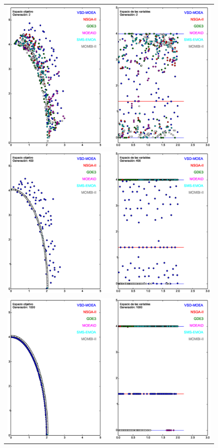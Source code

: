 \begin{figure}[t]
\centering
\begin{tabular}{l}
 \includegraphics[scale=0.3]{Images/Simulacion_Algoritmo_1.eps}\\[0cm]%
 \includegraphics[scale=0.3]{Images/Simulacion_Algoritmo_4.eps}\\[0cm]%
 \includegraphics[scale=0.3]{Images/Simulacion_Algoritmo_5.eps}\\[0cm]%

\end{tabular}
\end{figure}
